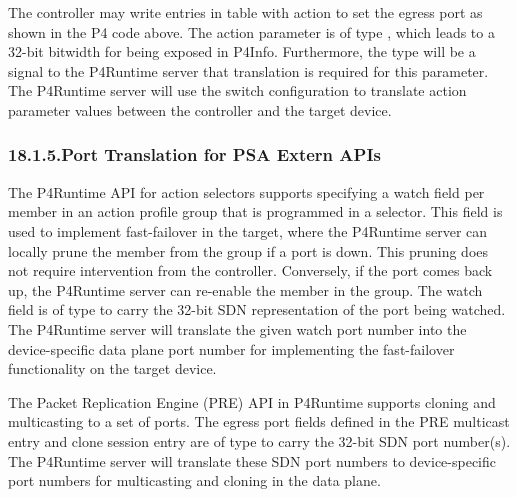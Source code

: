 \documentclass[11pt]{article}
\begin{document}
{%
\noindent{}The controller may write entries in table  with action  to set the egress
port as shown in the P4 code above. The action parameter  is of type
, which leads to a 32-bit bitwidth for  being exposed in
P4Info. Furthermore, the type will be a signal to the P4Runtime server that
translation is required for this parameter. The P4Runtime server will use the
switch configuration to translate action parameter values between the controller
and the target device.%

\subsubsection{18.1.5.\hspace*{0.5em}Port Translation for PSA Extern APIs}\label{sec-port-translation-for-psa-extern-apis}%

\noindent{}The P4Runtime API for action selectors supports specifying a watch field per
member in an action profile group that is programmed in a selector. This field
is used to implement fast-failover in the target, where the P4Runtime server can
locally prune the member from the group if a port is down. This pruning does not
require intervention from the controller. Conversely, if the port comes back up,
the P4Runtime server can re-enable the member in the group. The watch field is
of type  to carry the 32-bit SDN representation of the port being
watched. The P4Runtime server will translate the given watch port number into
the device-specific data plane port number for implementing the fast-failover
functionality on the target device.%

The Packet Replication Engine (PRE) API in P4Runtime supports cloning and
multicasting to a set of ports. The egress port fields defined in the PRE
multicast entry and clone session entry are of type  to carry the 32-bit
SDN port number(s). The P4Runtime server will translate these SDN port numbers
to device-specific port numbers for multicasting and cloning in the data plane.%

}
\end{document}
